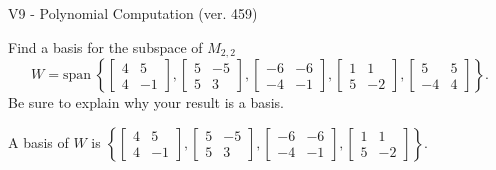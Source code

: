 \begin{exercise}
  \begin{exerciseTitle}V9 - Polynomial Computation (ver. 459)\end{exerciseTitle}
  \begin{exerciseStatement}
    Find a basis for the subspace of \(M_{2,2}\) 
\[W=\mathrm{span}\ \left\{\left[\begin{array}{cc}
4 & 5 \\
4 & -1
\end{array}\right] , \left[\begin{array}{cc}
5 & -5 \\
5 & 3
\end{array}\right] , \left[\begin{array}{cc}
-6 & -6 \\
-4 & -1
\end{array}\right] , \left[\begin{array}{cc}
1 & 1 \\
5 & -2
\end{array}\right] , \left[\begin{array}{cc}
5 & 5 \\
-4 & 4
\end{array}\right]\right\}.\]
 Be sure to explain why your result is a basis.


  \end{exerciseStatement}
  \begin{exerciseAnswer}
   A basis of \(W\) is  \(\left\{\left[\begin{array}{cc}
4 & 5 \\
4 & -1
\end{array}\right] , \left[\begin{array}{cc}
5 & -5 \\
5 & 3
\end{array}\right] , \left[\begin{array}{cc}
-6 & -6 \\
-4 & -1
\end{array}\right] , \left[\begin{array}{cc}
1 & 1 \\
5 & -2
\end{array}\right]\right\}\).
  


  \end{exerciseAnswer}
\end{exercise}